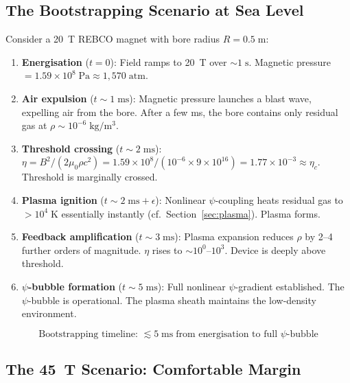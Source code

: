\documentclass[11pt,a4paper]{article}
\begin{document}
\subsection{The Bootstrapping Scenario at Sea Level}

Consider a 20~T REBCO magnet with bore radius $R = 0.5\;\mathrm{m}$:

\begin{enumerate}
\item \textbf{Energisation} ($t = 0$): Field ramps to 20~T over $\sim 1\;\mathrm{s}$.
Magnetic pressure $= 1.59 \times 10^8\;\mathrm{Pa} \approx 1{,}570\;\mathrm{atm}$.

\item \textbf{Air expulsion} ($t \sim 1\;\mathrm{ms}$): Magnetic pressure launches
a blast wave, expelling air from the bore. After a few ms, the bore contains only
residual gas at $\rho \sim 10^{-6}\;\mathrm{kg/m^3}$.

\item \textbf{Threshold crossing} ($t \sim 2\;\mathrm{ms}$):
$\eta = B^2/(2\mu_0 \rho c^2) = 1.59 \times 10^8 / (10^{-6} \times 9 \times 10^{16})
= 1.77 \times 10^{-3} \approx \eta_c$. Threshold is marginally crossed.

\item \textbf{Plasma ignition} ($t \sim 2\;\mathrm{ms} + \epsilon$): Nonlinear
$\psi$-coupling heats residual gas to $>10^4\;\mathrm{K}$ essentially instantly
(cf.\ Section~\ref{sec:plasma}). Plasma forms.

\item \textbf{Feedback amplification} ($t \sim 3\;\mathrm{ms}$): Plasma expansion
reduces $\rho$ by 2--4 further orders of magnitude. $\eta$ rises to $\sim 10^0$--$10^3$.
Device is deeply above threshold.

\item \textbf{$\psi$-bubble formation} ($t \sim 5\;\mathrm{ms}$): Full nonlinear
$\psi$-gradient established. The $\psi$-bubble is operational. The plasma sheath
maintains the low-density environment.
\end{enumerate}

\begin{equation}
\boxed{\text{Bootstrapping timeline: } \lesssim 5\;\mathrm{ms}
\;\text{from energisation to full }\psi\text{-bubble}}
\end{equation}

\subsection{The 45~T Scenario: Comfortable Margin}
\end{document}

